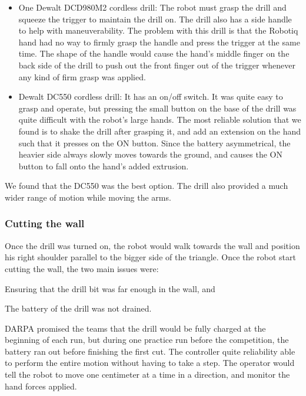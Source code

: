 \documentclass{article}
\begin{document}
\begin{itemize}
\item One Dewalt DCD980M2 cordless drill: The robot must grasp the drill and squeeze the trigger to maintain the drill on. The drill also has a side handle to help with maneuverability. The problem with this drill is that the Robotiq hand had no way to firmly grasp the handle and press the trigger at the same time. The shape of the handle would cause the hand's middle finger on the back side of the drill to push out the front finger out of the trigger whenever any kind of firm grasp was applied. 

\item Dewalt DC550 cordless drill: It has an on/off switch. It was quite easy to grasp and operate, but pressing the small button on the base of the drill was quite difficult with the robot's large hands. The most reliable solution that we found is to shake the drill after grasping it, and add an extension on the hand such that it presses on the ON button.  Since the battery asymmetrical, the heavier side always slowly moves towards the ground, and causes the ON button to fall onto the hand's added extrusion. 
\end{itemize}

We found that the DC550 was the best option. The drill also provided a much wider range of motion while moving the arms. 

\subsubsection{Cutting the wall}
Once the drill was turned on, the robot would walk towards the wall and position his right shoulder parallel to the bigger side of the triangle. Once the robot start cutting the wall, the two main issues were:  \begin{inparaenum}
\item Ensuring that the drill bit was far enough in the wall, and  
\item The battery of the drill was not drained. \end{inparaenum} 

DARPA promised the teams that the drill would be fully charged at the beginning of each run, but during one practice run before the competition, the battery ran out before finishing the first cut. The controller quite reliability able to perform the entire motion without having to take a step. The operator would tell the robot to move one centimeter at a time in a direction, and monitor the hand forces applied.  
\end{document}
